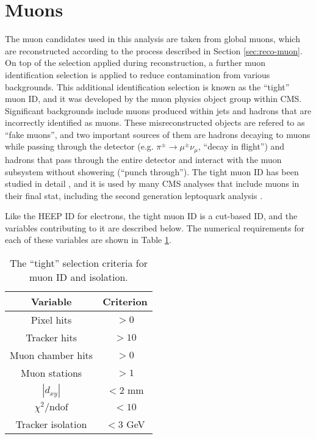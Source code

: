 \section{Muons}
\label{sec:id-muon}


The muon candidates used in this analysis are taken from
global muons, which are reconstructed according to the process
described in Section \ref{sec:reco-muon}.
On top of the selection applied during reconstruction,
a further muon identification selection is applied to reduce contamination from various backgrounds.
This additional identification selection is known as the ``tight'' muon ID, and it 
was developed by the muon physics object group within CMS.  
Significant backgrounds include muons produced within jets
and hadrons that are incorrectly identified as muons.  
These misreconstructed objects are refered to as ``fake muons'', and two important sources of them are
hadrons decaying to muons while passing through the detector 
(e.g. $\pi^{\pm} \rightarrow \mu^{\pm} \nu_{\mu}$, ``decay in flight'')
and hadrons that pass through the entire detector and interact with the 
muon subsystem without showering (``punch through'').
The tight muon ID has been studied in detail
\cite{muon-1}, and it is used by many CMS analyses that include muons in their final
stat, including the second generation leptoquark analysis \cite{pair-lq-CMS}.

Like the HEEP ID for electrons,
the tight muon ID is a cut-based ID, and the variables contributing to it are described
below. The numerical requirements for each of these variables are shown
in Table \ref{tab:muon-tight}.

\begin{table}
  \centering
  \begin{tabular}{c|c}
    Variable & Criterion \\
    \hline\hline
    Pixel hits & $>0$ \\
    Tracker hits & $>10$ \\
    Muon chamber hits & $>0$ \\
    Muon stations & $>1$ \\
    $|d_{xy}|$ & $<2 \text{ mm}$ \\
    $\chi^2/\text{ndof}$ & $<10$ \\
    Tracker isolation & $< 3$ GeV \\
  \end{tabular}
  \caption{The ``tight'' selection criteria for muon ID and isolation.}
  \label{tab:muon-tight}
\end{table}

